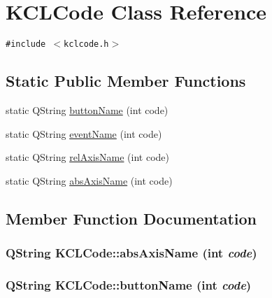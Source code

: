 \hypertarget{class_k_c_l_code}{
\section{KCLCode Class Reference}
\label{class_k_c_l_code}
}
{\tt \#include $<$kclcode.h$>$}

\subsection*{Static Public Member Functions}
\begin{CompactItemize}
\item 
static QString \hyperlink{class_k_c_l_code_28a2ca535676a60efadd5f09a5581734}{buttonName} (int code)
\item 
static QString \hyperlink{class_k_c_l_code_220faab8799839c0990bfab94921fef0}{eventName} (int code)
\item 
static QString \hyperlink{class_k_c_l_code_e9c9091ff36d6a0340170882e189177e}{relAxisName} (int code)
\item 
static QString \hyperlink{class_k_c_l_code_2278fc316adea05b567edddc37d21438}{absAxisName} (int code)
\end{CompactItemize}


\subsection{Member Function Documentation}
\hypertarget{class_k_c_l_code_2278fc316adea05b567edddc37d21438}{
\subsubsection[{absAxisName}]{\setlength{\rightskip}{0pt plus 5cm}QString KCLCode::absAxisName (int {\em code})}}
\label{class_k_c_l_code_2278fc316adea05b567edddc37d21438}


\hypertarget{class_k_c_l_code_28a2ca535676a60efadd5f09a5581734}{
\subsubsection[{buttonName}]{\setlength{\rightskip}{0pt plus 5cm}QString KCLCode::buttonName (int {\em code})}}
\label{class_k_c_l_code_28a2ca535676a60efadd5f09a5581734}


